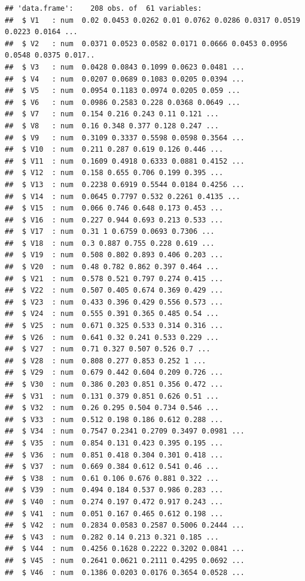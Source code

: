 \documentclass[
]{article}
\begin{document}
\begin{verbatim}
## 'data.frame':    208 obs. of  61 variables:
##  $ V1   : num  0.02 0.0453 0.0262 0.01 0.0762 0.0286 0.0317 0.0519 0.0223 0.0164 ...
##  $ V2   : num  0.0371 0.0523 0.0582 0.0171 0.0666 0.0453 0.0956 0.0548 0.0375 0.017..
##  $ V3   : num  0.0428 0.0843 0.1099 0.0623 0.0481 ...
##  $ V4   : num  0.0207 0.0689 0.1083 0.0205 0.0394 ...
##  $ V5   : num  0.0954 0.1183 0.0974 0.0205 0.059 ...
##  $ V6   : num  0.0986 0.2583 0.228 0.0368 0.0649 ...
##  $ V7   : num  0.154 0.216 0.243 0.11 0.121 ...
##  $ V8   : num  0.16 0.348 0.377 0.128 0.247 ...
##  $ V9   : num  0.3109 0.3337 0.5598 0.0598 0.3564 ...
##  $ V10  : num  0.211 0.287 0.619 0.126 0.446 ...
##  $ V11  : num  0.1609 0.4918 0.6333 0.0881 0.4152 ...
##  $ V12  : num  0.158 0.655 0.706 0.199 0.395 ...
##  $ V13  : num  0.2238 0.6919 0.5544 0.0184 0.4256 ...
##  $ V14  : num  0.0645 0.7797 0.532 0.2261 0.4135 ...
##  $ V15  : num  0.066 0.746 0.648 0.173 0.453 ...
##  $ V16  : num  0.227 0.944 0.693 0.213 0.533 ...
##  $ V17  : num  0.31 1 0.6759 0.0693 0.7306 ...
##  $ V18  : num  0.3 0.887 0.755 0.228 0.619 ...
##  $ V19  : num  0.508 0.802 0.893 0.406 0.203 ...
##  $ V20  : num  0.48 0.782 0.862 0.397 0.464 ...
##  $ V21  : num  0.578 0.521 0.797 0.274 0.415 ...
##  $ V22  : num  0.507 0.405 0.674 0.369 0.429 ...
##  $ V23  : num  0.433 0.396 0.429 0.556 0.573 ...
##  $ V24  : num  0.555 0.391 0.365 0.485 0.54 ...
##  $ V25  : num  0.671 0.325 0.533 0.314 0.316 ...
##  $ V26  : num  0.641 0.32 0.241 0.533 0.229 ...
##  $ V27  : num  0.71 0.327 0.507 0.526 0.7 ...
##  $ V28  : num  0.808 0.277 0.853 0.252 1 ...
##  $ V29  : num  0.679 0.442 0.604 0.209 0.726 ...
##  $ V30  : num  0.386 0.203 0.851 0.356 0.472 ...
##  $ V31  : num  0.131 0.379 0.851 0.626 0.51 ...
##  $ V32  : num  0.26 0.295 0.504 0.734 0.546 ...
##  $ V33  : num  0.512 0.198 0.186 0.612 0.288 ...
##  $ V34  : num  0.7547 0.2341 0.2709 0.3497 0.0981 ...
##  $ V35  : num  0.854 0.131 0.423 0.395 0.195 ...
##  $ V36  : num  0.851 0.418 0.304 0.301 0.418 ...
##  $ V37  : num  0.669 0.384 0.612 0.541 0.46 ...
##  $ V38  : num  0.61 0.106 0.676 0.881 0.322 ...
##  $ V39  : num  0.494 0.184 0.537 0.986 0.283 ...
##  $ V40  : num  0.274 0.197 0.472 0.917 0.243 ...
##  $ V41  : num  0.051 0.167 0.465 0.612 0.198 ...
##  $ V42  : num  0.2834 0.0583 0.2587 0.5006 0.2444 ...
##  $ V43  : num  0.282 0.14 0.213 0.321 0.185 ...
##  $ V44  : num  0.4256 0.1628 0.2222 0.3202 0.0841 ...
##  $ V45  : num  0.2641 0.0621 0.2111 0.4295 0.0692 ...
##  $ V46  : num  0.1386 0.0203 0.0176 0.3654 0.0528 ...

\end{verbatim}
\end{document}
